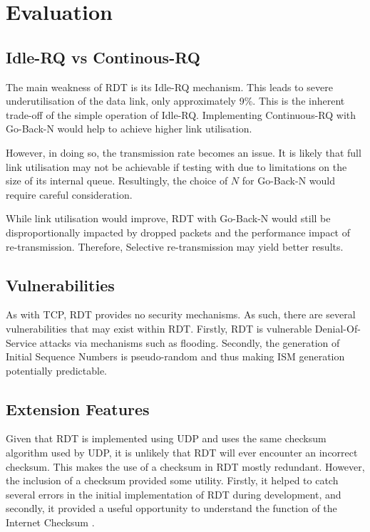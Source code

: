 \section{Evaluation}
\subsection{Idle-RQ vs Continous-RQ}
The main weakness of RDT is its Idle-RQ mechanism. This leads to severe underutilisation of the data link, only approximately 9\%. This is the inherent trade-off of the simple operation of Idle-RQ. Implementing Continuous-RQ with Go-Back-N would help to achieve higher link utilisation. 

However, in doing so, the transmission rate becomes an issue. It is likely that full link utilisation may not be achievable if testing with  due to limitations on the size of its internal queue. Resultingly, the choice of $N$ for Go-Back-N would require careful consideration. 

While link utilisation would improve, RDT with Go-Back-N would still be disproportionally impacted by dropped packets and the performance impact of re-transmission. Therefore, Selective re-transmission may yield better results.

\subsection{Vulnerabilities}
As with TCP, RDT provides no security mechanisms. As such, there are several vulnerabilities that may exist within RDT. 
Firstly, RDT is vulnerable Denial-Of-Service attacks via mechanisms such as  flooding.
Secondly, the generation of Initial Sequence Numbers is pseudo-random and thus making ISM generation potentially predictable. 

\subsection{Extension Features}

Given that RDT is implemented using UDP and uses the same checksum algorithm used by UDP, it is unlikely that RDT will ever encounter an incorrect checksum. This makes the use of a checksum in RDT mostly redundant. However, the inclusion of a checksum provided some utility. Firstly, it helped to catch several errors in the initial implementation of RDT during development, and secondly, it provided a useful opportunity to understand the function of the Internet Checksum \cite{rfc1071}.

